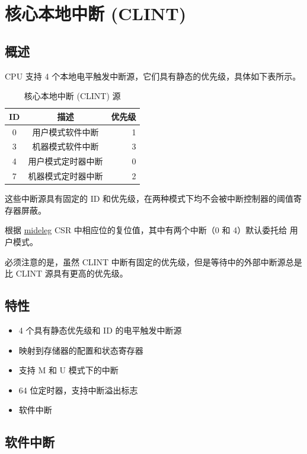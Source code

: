 \documentclass[main\_\_CN.tex]{subfiles}
\begin{document}
\clearpage
\section{核心本地中断 (CLINT)}
\label{sec:riscvcpu-clint}

\subsection{概述}
\label{sec:riscvcpu-clint-overview}

CPU 支持 4 个本地电平触发中断源，它们具有静态的优先级，具体如下表所示。

\begin{longtable}{ | c | c | r | }
\caption{核心本地中断 (CLINT) 源} \label{tab:riscvcpu-clint-table}
\\ \hline
\rowcolor{lightgray}
ID & 描述 & 优先级 \\ \hline
0 & 用户模式软件中断 & 1 \\ \hline
3 & 机器模式软件中断 & 3 \\ \hline
4 & 用户模式定时器中断 & 0 \\ \hline
7 & 机器模式定时器中断 & 2 \\ \hline
\end{longtable}

这些中断源具有固定的 ID 和优先级，在两种模式下均不会被中断控制器的阈值寄存器屏蔽。

根据 \hyperref[regdesc:MIDELEG]{mideleg} CSR 中相应位的复位值，其中有两个中断（0 和 4）默认委托给 用户模式。

必须注意的是，虽然 CLINT 中断有固定的优先级，但是等待中的外部中断源总是比 CLINT 源具有更高的优先级。

\subsection{特性}
\begin{itemize}
     \item 4 个具有静态优先级和 ID 的电平触发中断源
     \item 映射到存储器的配置和状态寄存器
     \item 支持 M 和 U 模式下的中断
     \item 64 位定时器，支持中断溢出标志
     \item 软件中断
\end{itemize}

\subsection{软件中断}
\label{sec:riscvcpu-clint-software}
\end{document}
